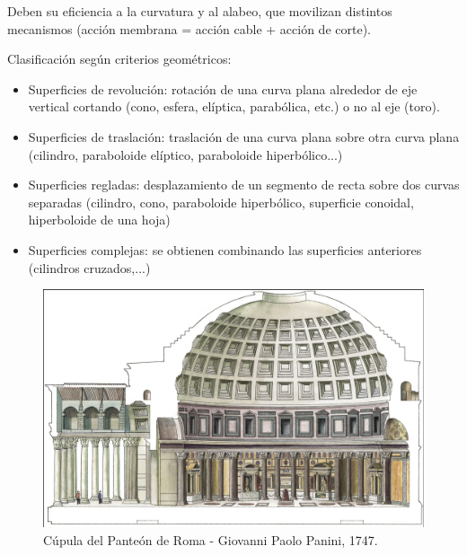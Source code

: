 Deben su eficiencia a la curvatura y al alabeo, que movilizan distintos mecanismos (acción membrana = acción cable + acción de corte).

Clasificación según criterios geométricos:
\begin{itemize}
    \item Superficies de revolución: rotación de una curva plana alrededor de eje vertical cortando (cono, esfera, elíptica, parabólica, etc.) o no al eje (toro).
    \item Superficies de traslación: traslación de una curva plana sobre otra curva plana (cilindro, paraboloide elíptico, paraboloide hiperbólico...)
    \item Superficies regladas: desplazamiento de un segmento de recta sobre dos curvas separadas (cilindro, cono, paraboloide hiperbólico, superficie conoidal, hiperboloide de una hoja)
    \item Superficies complejas: se obtienen combinando las superficies anteriores (cilindros cruzados,...)
\end{itemize}

\begin{figure}[h]
    \centering
    \includegraphics[width=1\linewidth]{Imagenes/Panteon.png}
    \caption{Cúpula del Panteón de Roma - Giovanni Paolo Panini, 1747.}
\end{figure}

